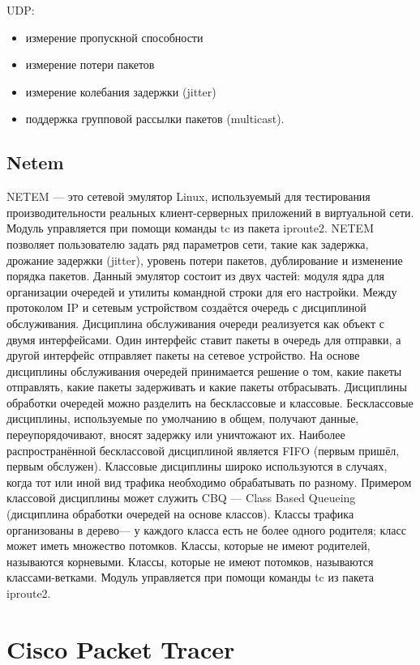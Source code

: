 UDP:
\begin{itemize}
\item измерение пропускной способности
\item измерение потери пакетов
\item измерение колебания задержки (jitter)
\item поддержка групповой рассылки пакетов (multicast).
\end{itemize}

\subsection{Netem}
\label{chap1:sec3}

NETEM —  это сетевой эмулятор Linux, используемый для тестирования производительности реальных клиент-серверных приложений в виртуальной сети. 
Модуль управляется при помощи команды tc из пакета iproute2. 
NETEM позволяет пользователю задать ряд параметров сети, такие как задержка, дрожание задержки (jitter), уровень потери пакетов, дублирование и изменение
порядка пакетов. Данный эмулятор состоит из двух частей: модуля ядра для организации очередей и утилиты командной строки для его настройки. Между
протоколом IP и сетевым устройством создаётся очередь с дисциплиной обслуживания. Дисциплина обслуживания очереди реализуется как объект с двумя
интерфейсами. Один интерфейс ставит пакеты в очередь для отправки, а другой
интерфейс отправляет пакеты на сетевое устройство. На основе дисциплины
обслуживания очередей принимается решение о том, какие пакеты отправлять,
какие пакеты задерживать и какие пакеты отбрасывать.
Дисциплины обработки очередей можно разделить на бесклассовые и классовые. Бесклассовые дисциплины, используемые по умолчанию в общем, получают данные, переупорядочивают,
вносят задержку или уничтожают их. Наиболее распространённой бесклассовой дисциплиной является FIFO
(первым пришёл, первым обслужен).
Классовые дисциплины широко используются в случаях, когда тот или иной
вид трафика необходимо обрабатывать по разному. Примером классовой дисциплины может служить CBQ — Class Based Queueing (дисциплина обработки
очередей на основе классов). Классы трафика организованы в дерево— у каждого
класса есть не более одного родителя; класс может иметь множество потомков.
Классы, которые не имеют родителей, называются корневыми. Классы, которые
не имеют потомков, называются классами-ветками.
Модуль управляется при помощи команды tc из пакета iproute2. 



\section{Cisco Packet Tracer}
\label{chap1:sec4}


